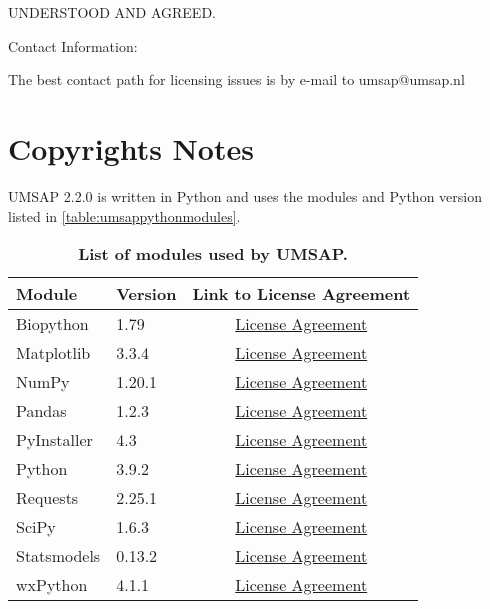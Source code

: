 UNDERSTOOD AND AGREED.

Contact Information:

The best contact path for licensing issues is by e-mail to umsap@umsap.nl

\section{Copyrights Notes}

UMSAP \num[parse-numbers=false]{2.2.0} is written in Python and uses the modules
and Python version listed in \autoref{table:umsappythonmodules}.
\begin{table}[h!]
    \centering
    \begin{tabular}{llc}
        \hline
        Module & Version & Link to License Agreement\\
        \hline
        Biopython   & \num{1.79}                        & \href{https://github.com/biopython/biopython/blob/master/LICENSE.rst}{License Agreement}\\
        Matplotlib  & \num[parse-numbers=false]{3.3.4}  & \href{https://matplotlib.org/3.3.4/users/license.html}{License Agreement}\\
        NumPy       & \num[parse-numbers=false]{1.20.1} & \href{https://numpy.org/doc/stable/license.html}{License Agreement}\\
        Pandas      & \num[parse-numbers=false]{1.2.3}  & \href{https://pandas.pydata.org/docs/getting_started/overview.html#license}{License Agreement}\\
        PyInstaller & \num{4.3}                         & \href{https://pyinstaller.org/en/stable/license.html}{License Agreement}\\
        Python      & \num[parse-numbers=false]{3.9.2}  & \href{https://docs.python.org/3.9/license.html}{License Agreement}\\
        Requests    & \num[parse-numbers=false]{2.25.1} & \href{https://github.com/psf/requests/blob/main/LICENSE}{License Agreement}\\
        SciPy       & \num[parse-numbers=false]{1.6.3}  & \href{https://github.com/scipy/scipy/blob/main/LICENSE.txt}{License Agreement}\\
        Statsmodels & \num[parse-numbers=false]{0.13.2} & \href{https://www.statsmodels.org/stable/dev/index.html#license}{License Agreement}\\
        wxPython    & \num[parse-numbers=false]{4.1.1}  & \href{https://wxpython.org/pages/license/index.html}{License Agreement}\\
        \hline
    \end{tabular}
    \caption[List of modules used by UMSAP]{\textbf{List of modules used by UMSAP.}}
    \label{table:umsappythonmodules}
\end{table}
\newpage